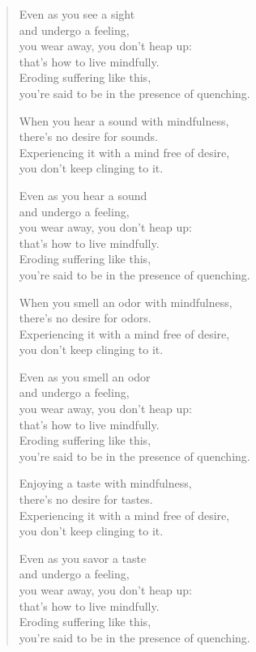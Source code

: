 \documentclass[12pt,openany]{book}%
\begin{document}
\begin{verse}
Even as you see a sight \\
and undergo a feeling, \\
you wear away, you don’t heap up: \\
that’s how to live mindfully. \\
Eroding suffering like this, \\
you’re said to be in the presence of quenching. 

When you hear a sound with mindfulness, \\
there’s no desire for sounds. \\
Experiencing it with a mind free of desire, \\
you don’t keep clinging to it. 

Even as you hear a sound \\
and undergo a feeling, \\
you wear away, you don’t heap up: \\
that’s how to live mindfully. \\
Eroding suffering like this, \\
you’re said to be in the presence of quenching. 

When you smell an odor with mindfulness, \\
there’s no desire for odors. \\
Experiencing it with a mind free of desire, \\
you don’t keep clinging to it. 

Even as you smell an odor \\
and undergo a feeling, \\
you wear away, you don’t heap up: \\
that’s how to live mindfully. \\
Eroding suffering like this, \\
you’re said to be in the presence of quenching. 

Enjoying a taste with mindfulness, \\
there’s no desire for tastes. \\
Experiencing it with a mind free of desire, \\
you don’t keep clinging to it. 

Even as you savor a taste \\
and undergo a feeling, \\
you wear away, you don’t heap up: \\
that’s how to live mindfully. \\
Eroding suffering like this, \\
you’re said to be in the presence of quenching. 


\end{verse}
\end{document}
